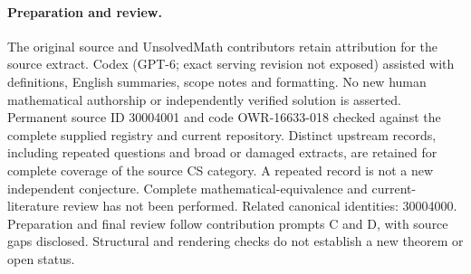 \documentclass[11pt]{article}
\begin{document}
\paragraph{Preparation and review.}
The original source and UnsolvedMath contributors retain attribution for the source extract. Codex (GPT-6; exact serving revision not exposed) assisted with definitions, English summaries, scope notes and formatting. No new human mathematical authorship or independently verified solution is asserted. Permanent source ID 30004001 and code OWR-16633-018 checked against the complete supplied registry and current repository. Distinct upstream records, including repeated questions and broad or damaged extracts, are retained for complete coverage of the source CS category. A repeated record is not a new independent conjecture. Complete mathematical-equivalence and current-literature review has not been performed. Related canonical identities: 30004000. Preparation and final review follow contribution prompts C and D, with source gaps disclosed. Structural and rendering checks do not establish a new theorem or open status.
\label{end:30004001}
\end{document}
